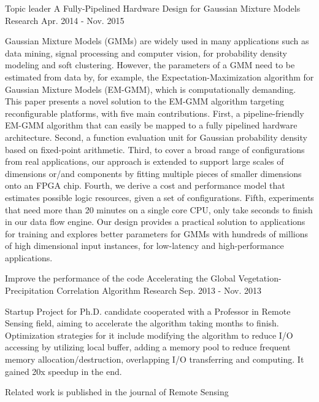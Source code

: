 \documentclass[11pt, a4paper]{awesome-cv}
\begin{document}
\begin{cventries}
  \cventry
    {Topic leader} %
    {A Fully-Pipelined Hardware Design for Gaussian Mixture Models} %
    {Research} %
    {Apr. 2014 - Nov. 2015} %
    {
      \begin{cvitems} %
        \item {Gaussian Mixture Models (GMMs) are widely used in many applications such as data mining, signal processing and computer vision, for probability density modeling and soft clustering. However, the parameters of a GMM need to be estimated from data by, for example, the Expectation-Maximization algorithm for Gaussian Mixture Models (EM-GMM), which is computationally demanding. This paper presents a novel solution to the EM-GMM algorithm targeting reconfigurable platforms, with five main contributions.  First, a pipeline-friendly EM-GMM algorithm that can easily be mapped to a fully pipelined hardware architecture. Second, a function evaluation unit for Gaussian probability density based on fixed-point arithmetic. Third, to cover a broad range of configurations from real applications, our approach is extended to support large scales of dimensions or/and components by fitting multiple pieces of smaller dimensions onto an FPGA chip. Fourth, we derive a cost and performance model that estimates possible logic resources, given a set of configurations. Fifth, experiments that need more than 20 minutes on a single core CPU, only take seconds to finish in our data flow engine.  Our design provides a practical solution to applications for training and explores better parameters for GMMs with hundreds of millions of high dimensional input instances, for low-latency and high-performance applications.}
      \end{cvitems}
    }

  \cventry
    {Improve the performance of the code} %
    {Accelerating the Global Vegetation-Precipitation Correlation Algorithm} %
    {Research} %
    {Sep. 2013 - Nov. 2013} %
    {
      \begin{cvitems} %
        \item {Startup Project for Ph.D. candidate cooperated with a Professor in Remote Sensing field, aiming to accelerate the algorithm taking months to finish. Optimization strategies for it include modifying the algorithm to reduce I/O accessing by utilizing local buffer, adding a memory pool to reduce frequent memory allocation/destruction, overlapping I/O transferring and computing. It gained 20x speedup in the end.}
        \item {Related work is published in the journal of Remote Sensing}
      \end{cvitems}
    }


\end{cventries}
\end{document}
